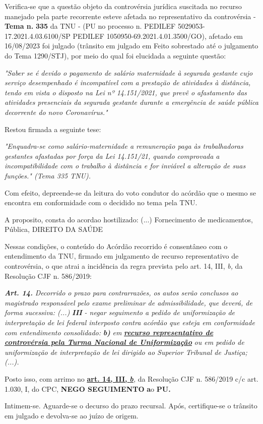 \documentclass[12pt]{article}
\begin{document}
\justifying
\noindent Verifica-se que a questão objeto da controvérsia jurídica suscitada no recurso manejado pela parte recorrente esteve afetada no representativo da controvérsia - \textbf{Tema n. }\textbf{335} da TNU - (PU no processo n. PEDILEF 5029053-17.2021.4.03.6100/SP PEDILEF 1050950-69.2021.4.01.3500/GO),  afetado em 16/08/2023 foi julgado (trânsito em julgado em Feito sobrestado até o julgamento do Tema 1290/STJ), por meio do qual foi elucidada a seguinte questão:

\noindent \textit{"Saber se é devido o pagamento de salário maternidade à segurada gestante cujo serviço desempenhado é incompatível com a prestação de atividades à distância, tendo em vista o disposto na Lei nº 14.151/2021, que prevê o afastamento das atividades presenciais da segurada gestante durante a emergência de saúde pública decorrente do novo Coronavírus."}

\noindent Restou firmada a seguinte tese:

\noindent \textit{"Enquadra-se como salário-maternidade a remuneração paga às trabalhadoras gestantes afastadas por força da Lei 14.151/21, quando comprovada a incompatibilidade com o trabalho à distância e for inviável a alteração de suas funções." (Tema 335 TNU).}

\noindent Com efeito, depreende-se da leitura do voto condutor do acórdão que o mesmo se encontra em conformidade com o decidido no  tema pela TNU.

\noindent A proposito, consta do acordao hostilizado: (...) Fornecimento de medicamentos, Pública, DIREITO DA SAÚDE

\noindent Nessas condições, o conteúdo do Acórdão recorrido é consentâneo com o entendimento da TNU, firmado em julgamento de recurso representativo de controvérsia, o que atrai a incidência da regra prevista pelo art. 14, III, \textit{b,} da Resolução CJF n. 586/2019:

\noindent \textit{\textbf{Art. 14.}}\textit{ Decorrido o prazo para contrarrazões, os autos serão conclusos ao magistrado responsável pelo exame preliminar de admissibilidade, que deverá, de forma sucessiva: (...) }\textit{\textbf{III }}\textit{- negar seguimento a pedido de uniformização de interpretação de lei federal interposto contra acórdão que esteja em conformidade com entendimento consolidado: }\textit{\textbf{b)}}\textit{ em }\uline{\textit{\textbf{recurso representativo de controvérsia pela Turma Nacional de Uniformização}}}\textit{ ou em pedido de uniformização de interpretação de lei dirigido ao Superior Tribunal de Justiça;(...).}

\noindent Posto isso, com arrimo no \uline{\textbf{art. 14, III, }}\uline{\textit{\textbf{b}}}\textit{,} da Resolução CJF n. 586/2019 c/c art. 1.030, I, do CPC, \textbf{NEGO SEGUIMENTO }\textbf{a}o\textbf{ PU}\textbf{.}

\noindent Intimem-se. Aguarde-se o decurso do prazo recursal. Após, certifique-se o trânsito em julgado e devolva-se ao juízo de origem.
\end{document}
